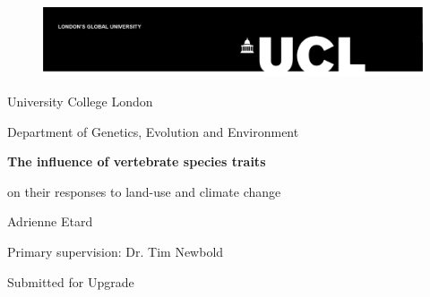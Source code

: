 \date{\today}

\begin{titlepage}

\begin{figure}
{\includegraphics[scale=0.8]{figures/UCL_logo}}
\end{figure}

\begin{center}

{\Large
University College London\par
Department of Genetics, Evolution and Environment\par
}
%
\vskip 6cm
%
{\huge \bf
The influence of vertebrate species traits  \par
on their responses to land-use and climate change\par
}
%
\vskip 4cm
%
{\Large
Adrienne Etard\par
Primary supervision: Dr. Tim Newbold\par

\vskip 2cm

\makeatletter
\@date
}
%
\vskip 3cm
%
{\large
Submitted for Upgrade}
\vfil
\end{center}
\end{titlepage}

\makeatother